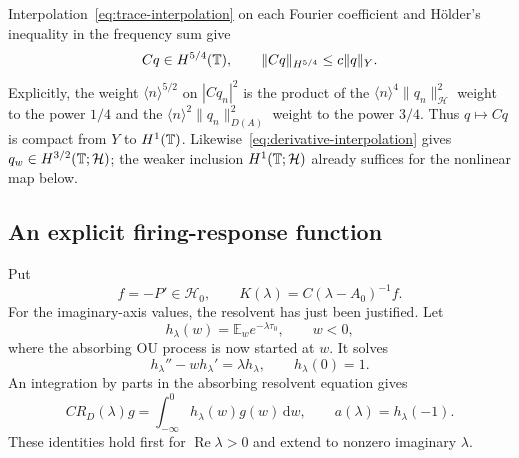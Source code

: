 \documentclass[11pt,a4paper]{article}
\numberwithin{equation}{section}
\theoremstyle{remark}\newtheorem{remark}[theorem]{Remark}
\newcommand{\HH}{\mathcal H}\newcommand{\DD}{\mathcal D}
\newcommand{\dd}{\,\mathrm d}
\DeclareMathOperator{\Rea}{Re}
\begin{document}
Interpolation~\eqref{eq:trace-interpolation} on each Fourier coefficient and H\"older's inequality in the frequency sum give
\begin{equation}\label{eq:time-trace}
 Cq\in H^{5/4}(\mathbb T),\qquad
 \|Cq\|_{H^{5/4}}\leq c\|q\|_Y.
\end{equation}
Explicitly, the weight $\langle n\rangle^{5/2}$ on $|Cq_n|^2$ is the product of the $\langle n\rangle^4\|q_n\|_\HH^2$ weight to the power $1/4$ and the $\langle n\rangle^2\|q_n\|_{D(A)}^2$ weight to the power $3/4$. Thus $q\mapsto Cq$ is compact from $Y$ to $H^1(\mathbb T)$. Likewise~\eqref{eq:derivative-interpolation} gives $q_w\in H^{3/2}(\T;\HH)$; the weaker inclusion $H^1(\T;\HH)$ already suffices for the nonlinear map below.

\subsection{An explicit firing-response function}
Put
\begin{equation}\label{eq:response}
 f=-P'\in\HH_0,
 \qquad K(\lambda)=C(\lambda-A_0)^{-1}f.
\end{equation}
For the imaginary-axis values, the resolvent has just been justified. Let
\[
 h_\lambda(w)=\mathbb E_w e^{-\lambda\tau_0},\qquad w<0,
\]
where the absorbing OU process is now started at $w$. It solves
\begin{equation}\label{eq:backward}
 h_\lambda''-w h_\lambda'=\lambda h_\lambda,
 \qquad h_\lambda(0)=1.
\end{equation}
An integration by parts in the absorbing resolvent equation gives
\[
 CR_D(\lambda)g=\int_{-\infty}^0h_\lambda(w)g(w)\dd w,
 \qquad a(\lambda)=h_\lambda(-1).
\]
These identities hold first for $\Rea\lambda>0$ and extend to nonzero imaginary $\lambda$.
\end{document}
